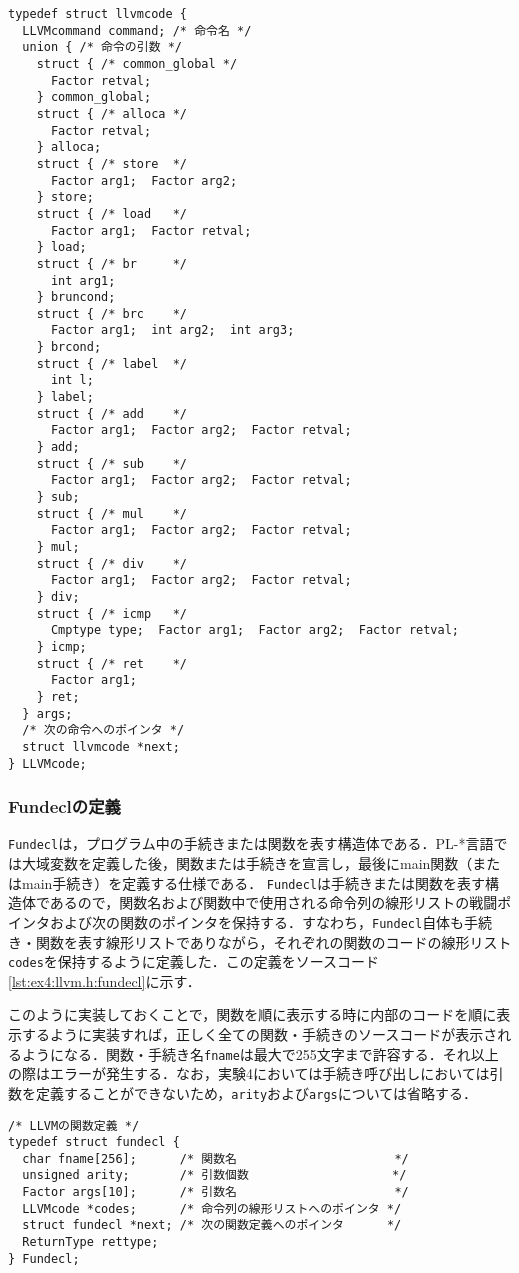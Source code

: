\documentclass[uplatex]{jsarticle}
\begin{document}
\begin{lstlisting}[caption=LLVM命令を表す構造体LLVMcode,label=lst:ex4:llvm.h:llvmcode]
typedef struct llvmcode {
  LLVMcommand command; /* 命令名 */
  union { /* 命令の引数 */
    struct { /* common_global */
      Factor retval;
    } common_global;
    struct { /* alloca */
      Factor retval;
    } alloca;
    struct { /* store  */
      Factor arg1;  Factor arg2;
    } store;
    struct { /* load   */
      Factor arg1;  Factor retval;
    } load;
    struct { /* br     */
      int arg1;
    } bruncond;
    struct { /* brc    */
      Factor arg1;  int arg2;  int arg3;
    } brcond;
    struct { /* label  */
      int l;
    } label;
    struct { /* add    */
      Factor arg1;  Factor arg2;  Factor retval;
    } add;
    struct { /* sub    */
      Factor arg1;  Factor arg2;  Factor retval;
    } sub;
    struct { /* mul    */
      Factor arg1;  Factor arg2;  Factor retval;
    } mul;
    struct { /* div    */
      Factor arg1;  Factor arg2;  Factor retval;
    } div;
    struct { /* icmp   */
      Cmptype type;  Factor arg1;  Factor arg2;  Factor retval;
    } icmp;
    struct { /* ret    */
      Factor arg1;
    } ret;
  } args;
  /* 次の命令へのポインタ */
  struct llvmcode *next;
} LLVMcode;
\end{lstlisting}
\subsubsection {Fundeclの定義}
\verb#Fundecl#は，プログラム中の手続きまたは関数を表す構造体である．PL-*言語では大域変数を定義した後，関数または手続きを宣言し，最後にmain関数（またはmain手続き）を定義する仕様である．
\verb#Fundecl#は手続きまたは関数を表す構造体であるので，関数名および関数中で使用される命令列の線形リストの戦闘ポインタおよび次の関数のポインタを保持する．すなわち，\verb#Fundecl#自体も手続き・関数を表す線形リストでありながら，それぞれの関数のコードの線形リスト\verb#codes#を保持するように定義した．この定義をソースコード\ref{lst:ex4:llvm.h:fundecl}に示す．

このように実装しておくことで，関数を順に表示する時に内部のコードを順に表示するように実装すれば，正しく全ての関数・手続きのソースコードが表示されるようになる．関数・手続き名\verb#fname#は最大で255文字まで許容する．それ以上の際はエラーが発生する．なお，実験4においては手続き呼び出しにおいては引数を定義することができないため，\verb#arity#および\verb#args#については省略する．
\begin{lstlisting}[caption=関数を表すFundecl,label=lst:ex4:llvm.h:fundecl]
/* LLVMの関数定義 */
typedef struct fundecl {
  char fname[256];      /* 関数名                      */
  unsigned arity;       /* 引数個数                    */
  Factor args[10];      /* 引数名                      */
  LLVMcode *codes;      /* 命令列の線形リストへのポインタ */
  struct fundecl *next; /* 次の関数定義へのポインタ      */
  ReturnType rettype;
} Fundecl;
\end{lstlisting}
\end{document}
